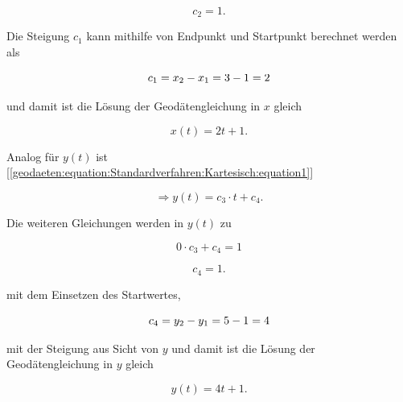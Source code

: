 \begin{equation}	
	c_2 = 1 .
\end{equation}

Die Steigung $c_1$ kann mithilfe von Endpunkt und Startpunkt berechnet werden als

\begin{equation}
	c_1 = x_2 - x_1 \\ = 3-1 \\ = 2
\end{equation}

und damit ist die Lösung der Geodätengleichung in $x$ gleich

\begin{equation}
	x(t) = 2t + 1 .
\end{equation}


Analog für $y(t)$ ist [\ref{geodaeten:equation:Standardverfahren:Kartesisch:equation1}]
  
\begin{equation}
	\Rightarrow y(t) = c_3 \cdot t + c_4  .
\end{equation}

Die weiteren Gleichungen werden in $y(t)$ zu

\begin{equation}
	0 \cdot c_3 + c_4 = 1 
\end{equation}
 
\begin{equation}	
	c_4 = 1 .
\end{equation}

mit dem Einsetzen des Startwertes,

\begin{equation}
	c_4 = y_2 - y_1 \\=5-1 = 4
\end{equation}

mit der Steigung aus Sicht von $y$ und damit ist die Lösung der Geodätengleichung in $y$ gleich

\begin{equation}
	y(t) = 4t + 1 .
\end{equation}

